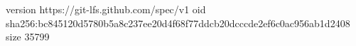 version https://git-lfs.github.com/spec/v1
oid sha256:bc845120d5780b5a8c237ee20d4f68f77ddcb20dcccde2ef6c0ac956ab1d2408
size 35799
